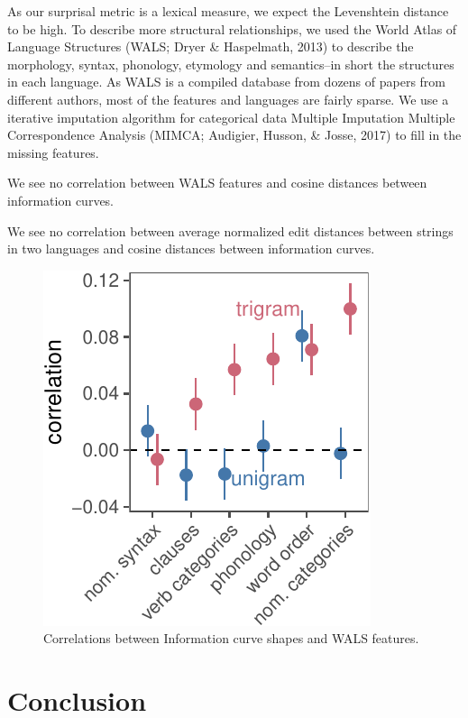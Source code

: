 \documentclass[10pt, letterpaper]{article}
\newenvironment{CodeChunk}{}{}
\begin{document}
As our surprisal metric is a lexical measure, we expect the Levenshtein
distance to be high. To describe more structural relationships, we used
the World Atlas of Language Structures (WALS; Dryer \& Haspelmath, 2013)
to describe the morphology, syntax, phonology, etymology and
semantics--in short the structures in each language. As WALS is a
compiled database from dozens of papers from different authors, most of
the features and languages are fairly sparse. We use a iterative
imputation algorithm for categorical data Multiple Imputation Multiple
Correspondence Analysis (MIMCA; Audigier, Husson, \& Josse, 2017) to
fill in the missing features.

We see no correlation between WALS features and cosine distances between
information curves.

We see no correlation between average normalized edit distances between
strings in two languages and cosine distances between information
curves.

\begin{CodeChunk}
\begin{figure}[tb]
\includegraphics{figs/type_cors-1} \caption[Correlations between Information curve shapes and WALS features]{Correlations between Information curve shapes and WALS features.}\label{fig:type_cors}
\end{figure}
\end{CodeChunk}

\hypertarget{conclusion}{%
\section{Conclusion}\label{conclusion}}
\end{document}
